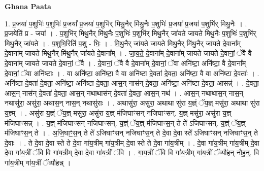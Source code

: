 \documentclass[17pt]{extarticle}
\begin{document}
\textbf{Ghana Paata } \newline

1. प्र॒जया॑ प॒शुभिः॑ प॒शुभिः॑ प्र॒जया᳚ प्र॒जया॑ प॒शुभि॑र् मिथु॒नैर् मि॑थु॒नैः प॒शुभिः॑ प्र॒जया᳚ प्र॒जया॑ प॒शुभि॑र् मिथु॒नैः । . प्र॒जयेति॑ प्र - जया᳚ । . प॒शुभि॑र् मिथु॒नैर् मि॑थु॒नैः प॒शुभिः॑ प॒शुभि॑र् मिथु॒नैर् जा॑यते जायते मिथु॒नैः प॒शुभिः॑ प॒शुभि॑र् मिथु॒नैर् जा॑यते । . प॒शुभि॒रिति॑ प॒शु - भिः॒ । . मि॒थु॒नैर् जा॑यते जायते मिथु॒नैर् मि॑थु॒नैर् जा॑यते दे॒वाना᳚म् दे॒वाना᳚म् जायते मिथु॒नैर् मि॑थु॒नैर् जा॑यते दे॒वाना᳚म् । . जा॒य॒ते॒ दे॒वाना᳚म् दे॒वाना᳚म् जायते जायते दे॒वानां॒ ॅवै वै दे॒वाना᳚म् जायते जायते दे॒वानां॒ ॅवै । . दे॒वानां॒ ॅवै वै दे॒वाना᳚म् दे॒वानां॒ ॅवा अनि॑ष्टा॒ अनि॑ष्टा॒ वै दे॒वाना᳚म् दे॒वानां॒ ॅवा अनि॑ष्टाः । . वा अनि॑ष्टा॒ अनि॑ष्टा॒ वै वा अनि॑ष्टा दे॒वता॑ दे॒वता॒ अनि॑ष्टा॒ वै वा अनि॑ष्टा दे॒वताः᳚ । . अनि॑ष्टा दे॒वता॑ दे॒वता॒ अनि॑ष्टा॒ अनि॑ष्टा दे॒वता॒ आस॒न् नास॑न् दे॒वता॒ अनि॑ष्टा॒ अनि॑ष्टा दे॒वता॒ आसन्न्॑ । . दे॒वता॒ आस॒न् नास॑न् दे॒वता॑ दे॒वता॒ आस॒न् नथाथास॑न् दे॒वता॑ दे॒वता॒ आस॒न् नथ॑ । . आस॒न् नथाथास॒न् नास॒न् नथासु॑रा॒ असु॑रा॒ अथास॒न् नास॒न् नथासु॑राः । . अथासु॑रा॒ असु॑रा॒ अथाथा सु॑रा य॒ज्ञ्ं ॅय॒ज्ञ् मसु॑रा॒ अथाथा सु॑रा य॒ज्ञ्म् । . असु॑रा य॒ज्ञ्ं ॅय॒ज्ञ् मसु॑रा॒ असु॑रा य॒ज्ञ् म॑जिघाꣳसन् नजिघाꣳसन्. य॒ज्ञ् मसु॑रा॒ असु॑रा य॒ज्ञ् म॑जिघाꣳसन्न् । . य॒ज्ञ् म॑जिघाꣳसन् नजिघाꣳसन्. य॒ज्ञ्ं ॅय॒ज्ञ् म॑जिघाꣳस॒न् ते ते॑ ऽजिघाꣳसन्. य॒ज्ञ्ं ॅय॒ज्ञ् म॑जिघाꣳस॒न् ते । . अ॒जि॒घाꣳ॒॒स॒न् ते ते॑ ऽजिघाꣳसन् नजिघाꣳस॒न् ते दे॒वा दे॒वा स्ते॑ ऽजिघाꣳसन् नजिघाꣳस॒न् ते दे॒वाः । . ते दे॒वा दे॒वा स्ते ते दे॒वा गा॑य॒त्रीम् गा॑य॒त्रीम् दे॒वा स्ते ते दे॒वा गा॑य॒त्रीम् । . दे॒वा गा॑य॒त्रीम् गा॑य॒त्रीम् दे॒वा दे॒वा गा॑य॒त्रीं ॅवि वि गा॑य॒त्रीम् दे॒वा दे॒वा गा॑य॒त्रीं ॅवि । . गा॒य॒त्रीं ॅवि वि गा॑य॒त्रीम् गा॑य॒त्रीं ॅव्यौ॑हन् नौह॒न्॒. वि गा॑य॒त्रीम् गा॑य॒त्रीं ॅव्यौ॑हन्न् । \newline
\end{document}
